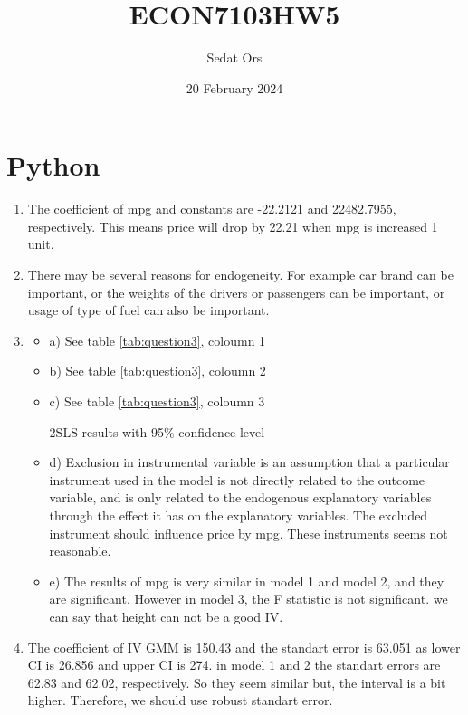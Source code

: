 \documentclass{article}
\title{ECON7103HW5}
\author{Sedat Ors}
\date{20 February 2024}
\begin{document}
\maketitle

\section{Python}

\begin{enumerate}

\item The coefficient of mpg and constants are -22.2121 and 22482.7955, respectively. This means price will drop by 22.21 when mpg is increased 1 unit.

\item There may be several reasons for endogeneity. For example car brand can be important, or the weights of the drivers or passengers can be important, or usage of type of fuel can also be important. 

\item
\begin{itemize}
    \item a) See table \ref{tab:question3}, coloumn 1
    \item b) See table \ref{tab:question3}, coloumn 2
    \item c) See table \ref{tab:question3}, coloumn 3
    \begin{table}[ht]
  \centering
    
    \caption{2SLS results with 95\% confidence level}
    \label{tab:question3}
\end{table}
  

\item d) Exclusion in instrumental variable is  an assumption that a particular instrument used in the model is not directly related to the outcome variable, and is only related to the endogenous explanatory variables through the effect it has on the explanatory variables. The excluded instrument should influence price by mpg. These instruments seems not reasonable.

\item e) The results of mpg is very similar in model 1 and model 2, and they are significant. However in model 3, the F statistic is not significant. we can say that height can not be a good IV. 

\end{itemize}

\item The coefficient of IV GMM is 150.43 and the standart error is 63.051 as lower CI is 26.856 and upper CI is 274. in model 1 and 2 the standart errors are 62.83 and 62.02, respectively. So they seem similar but, the interval is a bit higher. Therefore, we should use robust standart error. 

\end{enumerate}
\end{document}
